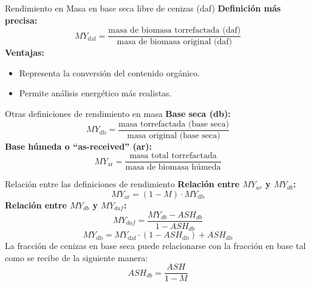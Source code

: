 \documentclass[main.tex]{subfiles}
\begin{document}
\begin{frame}{Rendimiento en Masa en base seca libre de cenizas (daf)}
\textbf{Definición más precisa:}
\[
MY_{\text{daf}} = \frac{\text{masa de biomasa torrefactada (daf)}}{\text{masa de biomasa original (daf)}}
\]
\textbf{Ventajas:}
\begin{itemize}
  \item Representa la conversión del contenido orgánico.
  \item Permite análisis energético más realistas.
\end{itemize}
\end{frame}

\begin{frame}{Otras definiciones de rendimiento en masa}
\textbf{Base seca (db):}
\[
MY_{\text{db}} = \frac{\text{masa torrefactada (base seca)}}{\text{masa original (base seca)}} 
\]
\textbf{Base húmeda o “as-received” (ar):}
\[
MY_{\text{ar}} = \frac{\text{masa total torrefactada}}{\text{masa de biomasa húmeda}}
\]
\end{frame}

\begin{frame}{Relación entre las definiciones de rendimiento}
\textbf{Relación entre $MY_{ar}$ y $MY_{db}$:}
\[
MY_{\text{ar}} = (1 - M) \cdot MY_{\text{db}} 
\]
\vspace{1em}
\textbf{Relación entre $MY_{db}$ y $MY_{daf}$:}
\[MY_{daf}=\frac{MY_{db}-ASH_{db}}{1-ASH_{db}}\]
\[
MY_{\text{db}} = MY_{\text{daf}} \cdot (1 - ASH_{\text{db}}) + ASH_{\text{db}} 
\]
La fracción de cenizas en base seca puede relacionarse con la fracción en base tal como se recibe de la siguiente manera:
\[ASH_{db}=\frac{ASH}{1-M}\]
\end{frame}
\end{document}
